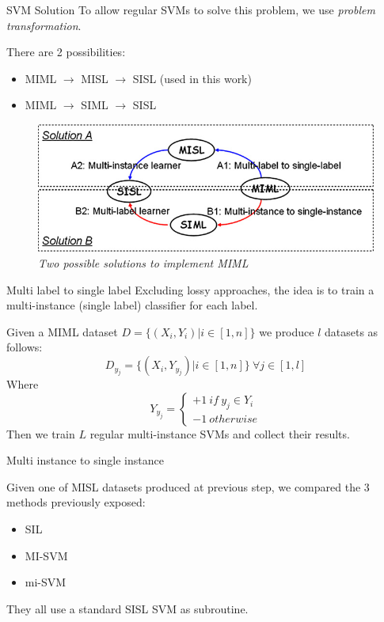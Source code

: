 \begin{frame}{SVM Solution}
	To allow regular SVMs to solve this problem, we use \textit{problem transformation}.
	
	There are 2 possibilities:
	\begin{itemize}
		\item MIML $\rightarrow$ MISL $\rightarrow$ SISL (used in this work)
		\item MIML $\rightarrow$ SIML $\rightarrow$ SISL
	\end{itemize}
	\begin{figure}[htbp]
		\centering
		\includegraphics[scale = 0.40]{./images/2-metodi.png}
		\caption{\textit{Two possible solutions to implement MIML}}
	\end{figure}
\end{frame}

\begin{frame}{Multi label to single label}
	Excluding lossy approaches, the idea is to train a multi-instance (single label) classifier for each label.
	
	Given a MIML dataset $D = \{(X_i, Y_i) | i \in [1, n]\}$	we produce $l$ datasets as follows:
	$$D_{y_j} = \{(X_i, Y_{y_j}) | i \in [1, n]\} \ \forall j \in [1, l]$$
	Where
	$$Y_{y_j} = 
	\begin{cases}
		+1 \ if \ y_j \in Y_i \\
		-1 \ otherwise
	\end{cases}$$
	Then we train $L$ regular multi-instance SVMs and collect their results.
\end{frame}

\begin{frame}{Multi instance to single instance}

	Given one of MISL datasets produced at previous step, we compared the 3 methods previously exposed:
	\begin{itemize}
		\item SIL
		\item MI-SVM
		\item mi-SVM
	\end{itemize}
	
	They all use a standard SISL SVM as subroutine.
\end{frame}
